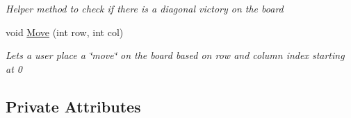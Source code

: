 \begin{DoxyCompactItemize}
\begin{DoxyCompactList}\small\item\em Helper method to check if there is a diagonal victory on the board \end{DoxyCompactList}\item 
void \hyperlink{class_tic_tac_toe_1_1_tic_tac_toe_a4930e06e7982e729a55c18feca089d06}{Move} (int row, int col)
\begin{DoxyCompactList}\small\item\em Lets a user place a \char`\"{}move\char`\"{} on the board based on row and column index starting at 0 \end{DoxyCompactList}\end{DoxyCompactItemize}
\subsection*{Private Attributes}
